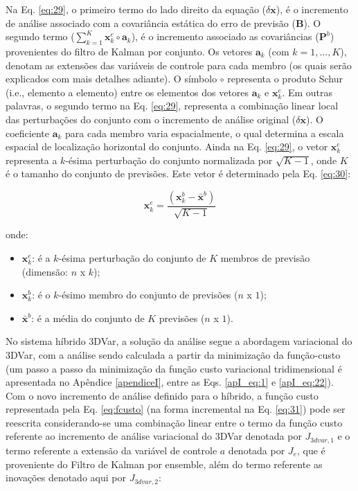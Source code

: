 Na Eq. \ref{eq:29}, o primeiro termo do lado direito da equação ($\delta{\mathbf{x}}$), é o incremento de análise associado com a covariância estática do erro de previsão ($\mathbf{B}$). O segundo termo ($\sum_{k=1}^{K}{\mathbf{x}_{k}^{e} \circ \mathbf{a}_{k}}$), é o incremento associado as covariâncias ($\mathbf{P}^{b}$) provenientes do filtro de Kalman por conjunto. Os vetores $\mathbf{a}_{k}$ (com $k=1,...,K$), denotam as extensões das variáveis de controle para cada membro (os quais serão explicados com mais detalhes adiante). O símbolo $\circ$ representa o produto Schur (i.e., elemento a elemento) entre os elementos dos vetores $\mathbf{a}_{k}$ e $\mathbf{x}_{k}^{e}$. Em outras palavras, o segundo termo na Eq. \ref{eq:29}, representa a combinação linear local das perturbações do conjunto com o incremento de análise original ($\delta{\mathbf{x}}$). O coeficiente $\mathbf{a}_{k}$ para cada membro varia espacialmente, o qual determina a escala espacial de localização horizontal do conjunto. Ainda na Eq. \ref{eq:29}, o vetor $\mathbf{x}_{k}^{e}$ representa a $k$-ésima perturbação do conjunto normalizada por $\sqrt{K-1}$, onde $K$ é o tamanho do conjunto de previsões. Este vetor é determinado pela Eq. \ref{eq:30}:

\begin{equation}
\label{eq:30}
\mathbf{x}_{k}^{e} = \frac{(\mathbf{x}_{k}^{b} - \bar{\mathbf{x}}^{b})}{\sqrt{K-1}}
\end{equation}

onde:

\begin{itemize}
    \item $\mathbf{x}_{k}^{e}$: é a $k$-ésima perturbação do conjunto de $K$ membros de previsão (dimensão: $n$ x $k$);
    \item $\mathbf{x}_{k}^{b}$: é o $k$-ésimo membro do conjunto de previsões ($n$ x $1$);
    \item $\bar{\mathbf{x}}^{b}$: é a média do conjunto de $K$ previsões ($n$ x $1$).
\end{itemize}

No sistema híbrido 3DVar, a solução da análise segue a abordagem variacional do 3DVar, com a análise sendo calculada a partir da minimização da função-custo (um passo a passo da minimização da função custo variacional tridimensional é apresentada no Apêndice \ref{apendiceI}, entre as Eqs. \ref{apI_eq:1} e \ref{apI_eq:22}). Com o novo incremento de análise definido para o híbrido, a função custo representada pela Eq. \ref{eq:fcusto} (na forma incremental na Eq. \ref{eq:31}) pode ser reescrita considerando-se uma combinação linear entre o termo da função custo referente ao incremento de análise variacional do 3DVar denotada por $\textit{J}_{3dvar,1}$ e o termo referente a extensão da variável de controle $a$ denotada por $\textit{J}_{e}$, que é proveniente do Filtro de Kalman por ensemble, além do termo referente as inovações denotado aqui por $\textit{J}_{3dvar,2}$: 

